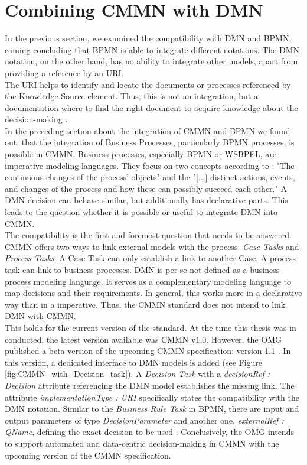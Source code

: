 \section{Combining CMMN with DMN}
In the previous section, we examined the compatibility with DMN and BPMN, coming concluding that BPMN is able to integrate different notations. The DMN notation, on the other hand, has no ability to integrate other models, apart from providing a reference by an \ac{URI}. \\
The URI helps to identify and locate the documents or processes referenced by the Knowledge Source element. \enlargethispage{1\baselineskip}Thus, this is not an integration, but a documentation where to find the right document to acquire knowledge about the decision-making \cite{DMNspec2016}. \\
In the preceding section about the integration of CMMN and BPMN we found out, that the integration of Business Processes, particularly BPMN processes, is possible in CMMN. Business processes, especially \ac{BPMN} or \ac{WSBPEL}, are imperative modeling languages. They focus on two concepts according to \cite{FahlandLuebkeMendlingEtAl2009}: "The continuous changes of the process' objects" and the "[...] distinct actions, events, and changes of the process and how these can possibly succeed each other." A DMN decision can behave similar, but additionally has declarative parts. This leads to the question whether it is possible or useful to integrate DMN into CMMN. \\
The compatibility is the first and foremost question that needs to be answered. CMMN offers two ways to link external models with the process: \textit{Case Tasks} and \textit{Process Tasks}. A Case Task can only establish a link to another Case. A process task can link to business processes. DMN is per se not defined as a business process modeling language. It serves as a complementary modeling language to map decisions and their requirements. In general, this works more in a declarative way than in a imperative. Thus, the CMMN standard does not intend to link DMN with CMMN. \\ %
This holds for the current version of the standard. At the time this thesis was in conducted, the latest version available was CMMN v1.0. However, the OMG published a beta version of the upcoming CMMN specification: version 1.1 \cite{CMMNbeta}. In this version, a dedicated interface to DMN models is added (see Figure \ref{fig:CMMN_with_Decision_task}). A \textit{Decision Task} with a \textit{decisionRef : Decision} attribute referencing the DMN model establishes the missing link. The attribute \textit{implementationType : URI} specifically states the compatibility with the DMN notation. Similar to the \textit{Business Rule Task} in BPMN, there are input and output parameters of type \textit{DecisionParameter} and another one, \textit{externalRef : QName}, defining the exact decision to be used \cite{CMMNbeta}. 
Conclusively, the OMG intends to support automated and data-centric decision-making in CMMN with the upcoming version of the CMMN specification.   \\

